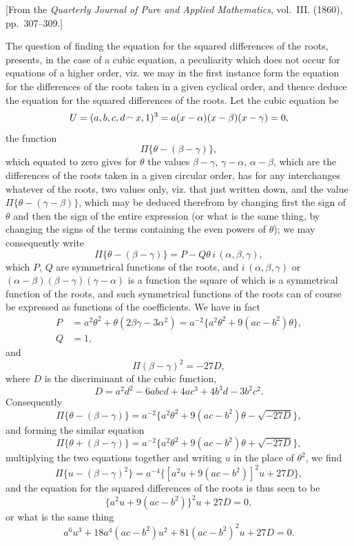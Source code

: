 \documentclass[11pt,a4paper]{book}
\begin{document}
[From the \textit{Quarterly Journal of Pure and Applied Mathematics}, vol.~III. (1860), pp.~307--309.]

The question of finding the equation for the squared differences of the roots, presents, in the case of a cubic equation, a peculiarity which does not occur for equations of a higher order, viz. we may in the first instance form the equation for the differences of the roots taken in a given cyclical order, and thence deduce the equation for the squared differences of the roots. Let the cubic equation be
\[
U = (a, b, c, d \mathbin{\vcenter{\hbox{$\scriptstyle\!\frown$}}} x, 1)^3 = a(x - \alpha)(x - \beta)(x - \gamma) = 0,
\]
the function
\[
\Pi\{\theta - (\beta - \gamma)\},
\]
which equated to zero gives for $\theta$ the values $\beta - \gamma$, $\gamma - \alpha$, $\alpha - \beta$, which are the differences of the roots taken in a given circular order, has for any interchanges whatever of the roots, two values only, viz. that just written down, and the value $\Pi\{\theta - (\gamma - \beta)\}$, which may be deduced therefrom by changing first the sign of $\theta$ and then the sign of the entire expression (or what is the same thing, by changing the signs of the terms containing the even powers of $\theta$); we may consequently write
\[
\Pi\{\theta - (\beta - \gamma)\} = P - Q\theta\, i\,(\alpha, \beta, \gamma),
\]
which $P$, $Q$ are symmetrical functions of the roots, and $i\,(\alpha, \beta, \gamma)$ or $(\alpha - \beta)(\beta - \gamma)(\gamma - \alpha)$ is a function the square of which is a symmetrical function of the roots, and such symmetrical functions of the roots can of course be expressed as functions of the coefficients. We have in fact
\begin{align*}
P &= a^2\theta^2 + \theta(2\beta\gamma - 3\alpha^2) = a^{-2}\{a^2\theta^2 + 9(ac - b^2)\theta\},\\
Q &= 1,
\end{align*}
and
\[
\Pi(\beta - \gamma)^2 = -27D,
\]
where $D$ is the discriminant of the cubic function,
\[
D = a^2d^2 - 6abcd + 4ac^3 + 4b^3d - 3b^2c^2.
\]
Consequently
\[
\Pi\{\theta - (\beta - \gamma)\} = a^{-2}\{a^2\theta^2 + 9(ac - b^2)\theta - \sqrt{-27D}\},
\]
and forming the similar equation
\[
\Pi\{\theta + (\beta - \gamma)\} = a^{-2}\{a^2\theta^2 + 9(ac - b^2)\theta + \sqrt{-27D}\},
\]
multiplying the two equations together and writing $u$ in the place of $\theta^2$, we find
\[
\Pi\{u - (\beta - \gamma)^2\} = a^{-4}\{[a^2u + 9(ac - b^2)]^2u + 27D\},
\]
and the equation for the squared differences of the roots is thus seen to be
\[
\{a^2u + 9(ac - b^2)\}^2u + 27D = 0,
\]
or what is the same thing
\[
a^6u^3 + 18a^4(ac - b^2)u^2 + 81(ac - b^2)^2u + 27D = 0.
\]
\end{document}
